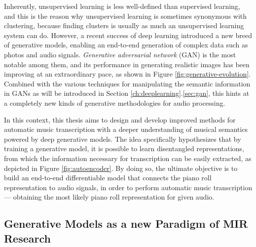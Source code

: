 Inherently, unsupervised learning is less well-defined than supervised learning, and this is the reason why unsupervised learning is sometimes synonymous with clustering, because finding clusters is usually as much an unsupervised learning system can do.
However, a recent success of deep learning introduced a new breed of generative models, enabling an end-to-end generation of complex data such as photos and audio signals.
\emph{Generative adversarial network} (GAN) \cite{goodfellow2014gan} is the most notable among them, and its performance in generating realistic images has been improving at an extraordinary pace, as shown in Figure \ref{fig:generative-evolution}.
Combined with the various techniques for manipulating the semantic information in GANs as will be introduced in Section \ref{ch:deeplearning}.\ref{sec:gan}, this hints at a completely new kinds of generative methodologies for audio processing.


In this context, this thesis aims to design and develop improved methods for automatic music transcription with a deeper understanding of musical semantics powered by deep generative models.
The idea specifically hypothesizes that by training a generative model, it is possible to learn disentangled representations, from which the information necessary for transcription can be easily extracted, as depicted in Figure \ref{fig:autoencoder}.
By doing so, the ultimate objective is to build an end-to-end differentiable model that connects the piano roll representation to audio signals, in order to perform automatic music transcription --- obtaining the most likely piano roll representation for given audio.


\subsection{Generative Models as a new Paradigm of MIR Research}

